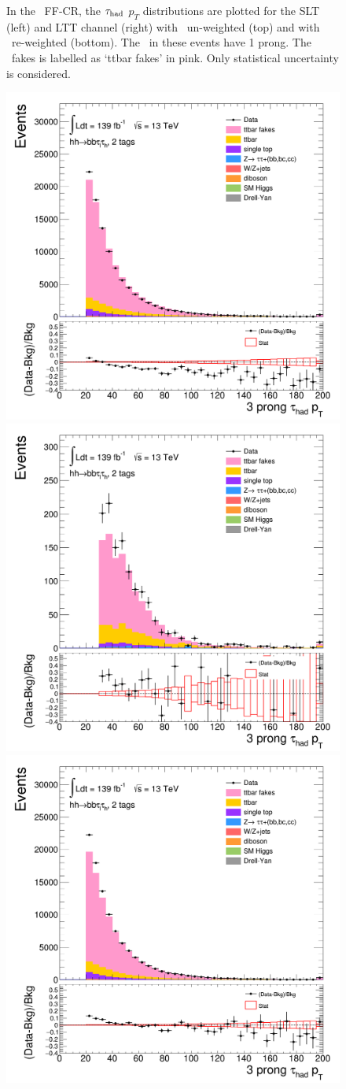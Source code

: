 \begin{figure}[htbp]
\caption{In the \ttbar\ FF-CR, the $\tau_{\mathrm{had}}$ $p_T$ distributions are plotted 
for the SLT (left) and LTT channel (right) 
with \ttbar\ un-weighted (top) 
and with \ttbar\ re-weighted (bottom).
The \tauhad\ in these events have 1 prong. 
The \ttbar\ fakes is labelled as `ttbar fakes' in pink.
Only statistical uncertainty is considered.}
\label{fig:ttbarCR_1}
\end{figure} 
\begin{figure}[htbp]
\centering
\includegraphics[width=.45\textwidth]{DiHiggs/plots/FF_CRs/ttbarCR_SLT/HNone/BDTVarsHighMbb/2/C_2tag2pjet_0ptv_TauPt3P.png}
\includegraphics[width=.45\textwidth]{DiHiggs/plots/FF_CRs/ttbarCR_LTT/HNone/BDTVarsHighMbb/2/C_2tag2pjet_0ptv_TauPt3P.png}\\
\includegraphics[width=.45\textwidth]{DiHiggs/plots/FF_CRs/ttbarCR_SLT_weighted/HNone/BDTVarsHighMbb/2/C_2tag2pjet_0ptv_TauPt3P.png}

\end{figure}
